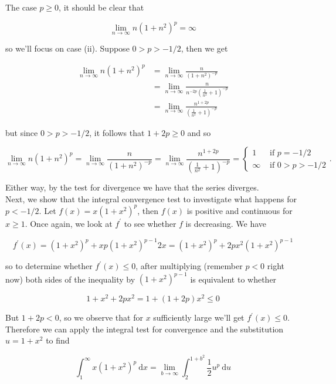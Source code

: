 \documentclass[10pt]{article}
\begin{document}
The case $p \geq 0$, it should be clear that

$$
\lim _{n \rightarrow \infty} n\left(1+n^{2}\right)^{p}=\infty
$$

so we'll focus on case (ii). Suppose $0>p>-1 / 2$, then we get

$$
\begin{aligned}
\lim _{n \rightarrow \infty} n\left(1+n^{2}\right)^{p} & =\lim _{n \rightarrow \infty} \frac{n}{\left(1+n^{2}\right)^{-p}} \\
& =\lim _{n \rightarrow \infty} \frac{n}{n^{-2 p}\left(\frac{1}{n^{2}}+1\right)^{-p}} \\
& =\lim _{n \rightarrow \infty} \frac{n^{1+2 p}}{\left(\frac{1}{n^{2}}+1\right)^{-p}}
\end{aligned}
$$

but since $0>p>-1 / 2$, it follows that $1+2 p \geq 0$ and so

$$
\lim _{n \rightarrow \infty} n\left(1+n^{2}\right)^{p}=\lim _{n \rightarrow \infty} \frac{n}{\left(1+n^{2}\right)^{-p}}=\lim _{n \rightarrow \infty} \frac{n^{1+2 p}}{\left(\frac{1}{n^{2}}+1\right)^{-p}}=\left\{\begin{array}{ll}
1 & \text { if } p=-1 / 2 \\
\infty & \text { if } 0>p>-1 / 2
\end{array} .\right.
$$

Either way, by the test for divergence we have that the series diverges.\\
Next, we show that the integral convergence test to investigate what happens for $p<-1 / 2$. Let $f(x)=x\left(1+x^{2}\right)^{p}$, then $f(x)$ is positive and continuous for $x \geq 1$. Once again, we look at $f^{\prime}$ to see whether $f$ is decreasing. We have

$$
f^{\prime}(x)=\left(1+x^{2}\right)^{p}+x p\left(1+x^{2}\right)^{p-1} 2 x=\left(1+x^{2}\right)^{p}+2 p x^{2}\left(1+x^{2}\right)^{p-1}
$$

so to determine whether $f^{\prime}(x) \leq 0$, after multiplying (remember $p<0$ right now) both sides of the inequality by $\left(1+x^{2}\right)^{p-1}$ is equivalent to whether

$$
1+x^{2}+2 p x^{2}=1+(1+2 p) x^{2} \leq 0
$$

But $1+2 p<0$, so we observe that for $x$ sufficiently large we'll get $f^{\prime}(x) \leq 0$. Therefore we can apply the integral test for convergence and the substitution $u=1+x^{2}$ to find

$$
\int_{1}^{\infty} x\left(1+x^{2}\right)^{p} \mathrm{~d} x=\lim _{b \rightarrow \infty} \int_{2}^{1+b^{2}} \frac{1}{2} u^{p} \mathrm{~d} u
$$
\end{document}
